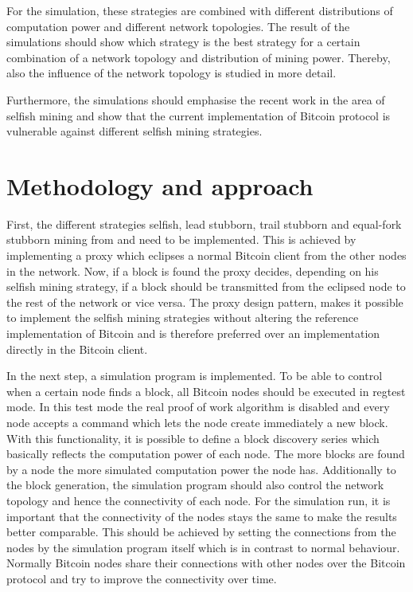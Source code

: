 \documentclass{scrartcl}
\begin{document}
For the simulation, these strategies are combined with different distributions of computation power and different network topologies.
The result of the simulations should show which strategy is the best strategy for a certain combination of a network topology and distribution of mining power.
Thereby, also the influence of the network topology is studied in more detail.

Furthermore, the simulations should emphasise the recent work in the area of selfish mining and show that the current implementation of Bitcoin protocol is vulnerable against different selfish mining strategies.

\section{Methodology and approach}
First, the different strategies selfish, lead stubborn, trail stubborn and equal-fork stubborn mining from \citeauthor{nayak2016stubborn} and \citeauthor{eyal2014majority} need to be implemented.
This is achieved by implementing a proxy which eclipses a normal Bitcoin client from the other nodes in the network.
Now, if a block is found the proxy decides, depending on his selfish mining strategy, if a block should be transmitted from the eclipsed node to the rest of the network or vice versa.
The proxy design pattern, makes it possible to implement the selfish mining strategies without altering the reference implementation of Bitcoin and is therefore preferred over an implementation directly in the Bitcoin client.

In the next step, a simulation program is implemented.
To be able to control when a certain node finds a block, all Bitcoin nodes should be executed in regtest mode.
In this test mode the real proof of work algorithm is disabled and every node accepts a command which lets the node create immediately a new block.
With this functionality, it is possible to define a block discovery series which basically reflects the computation power of each node.
The more blocks are found by a node the more simulated computation power the node has.
Additionally to the block generation, the simulation program should also control the network topology and hence the connectivity of each node.
For the simulation run, it is important that the connectivity of the nodes stays the same to make the results better comparable.
This should be achieved by setting the connections from the nodes by the simulation program itself which is in contrast to normal behaviour.
Normally Bitcoin nodes share their connections with other nodes over the Bitcoin protocol and try to improve the connectivity over time.
\end{document}
